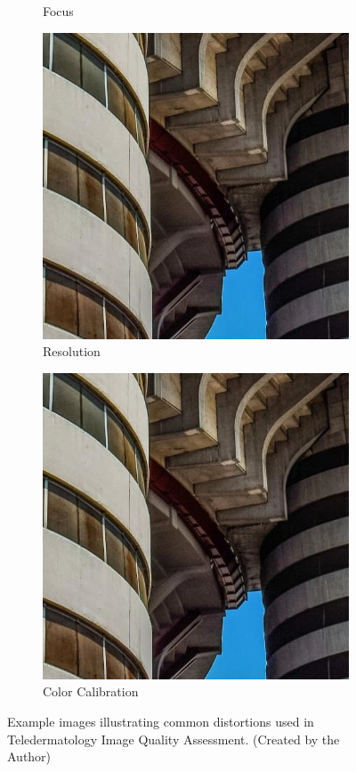 \begin{figure}[ht]
\begin{subfigure}[b]{0.24\textwidth}
        \caption{Focus}
        \label{fig:focus}
    \end{subfigure}
    \hfill
    \begin{subfigure}[b]{0.24\textwidth}
        \includegraphics[width=\textwidth]{img/Original.jpg}
        \caption{Resolution}
        \label{fig:resol}
    \end{subfigure}
    \hfill
    \begin{subfigure}[b]{0.24\textwidth}
        \includegraphics[width=\textwidth]{img/Original.jpg}
        \caption{Color Calibration}
        \label{fig:cc}
    \end{subfigure}
    \caption{Example images illustrating common distortions used in Teledermatology Image Quality Assessment. (Created by the Author)}
    \label{fig:quality_criteria}
\end{figure}
